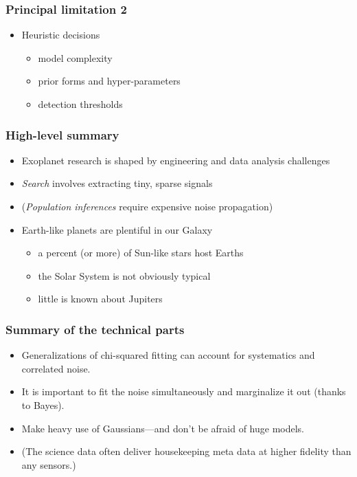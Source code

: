\documentclass[pdftex]{beamer}
\newcommand{\conclusions}{%
\begin{frame}
  \frametitle{High-level summary}
  \begin{itemize}
  \item Exoplanet research is shaped by engineering and data analysis challenges
  \item \emph{Search} involves extracting tiny, sparse signals
  \item (\emph{Population inferences} require expensive noise propagation)
  \item Earth-like planets are plentiful in our Galaxy
    \begin{itemize}
    \item a percent (or more) of Sun-like stars host Earths
    \item the Solar System is not obviously typical
    \item little is known about Jupiters
    \end{itemize}
  \end{itemize}
\end{frame}

\begin{frame}
  \frametitle{Summary of the technical parts}
  \begin{itemize}
  \item Generalizations of chi-squared fitting can account for
    systematics and correlated noise.
  \item It is important to fit the noise simultaneously and
    marginalize it out (thanks to Bayes).
  \item Make heavy use of Gaussians---and don't be afraid of huge models.
  \item (The science data often deliver housekeeping meta data at
    higher fidelity than any sensors.)
  \end{itemize}
\end{frame}}
\begin{document}
\begin{frame}
  \frametitle{Principal limitation 2}
  \begin{itemize}
  \item Heuristic decisions
    \begin{itemize}
    \item model complexity
    \item prior forms and hyper-parameters
    \item detection thresholds
    \end{itemize}
  \end{itemize}
\end{frame}

\conclusions
\end{document}
